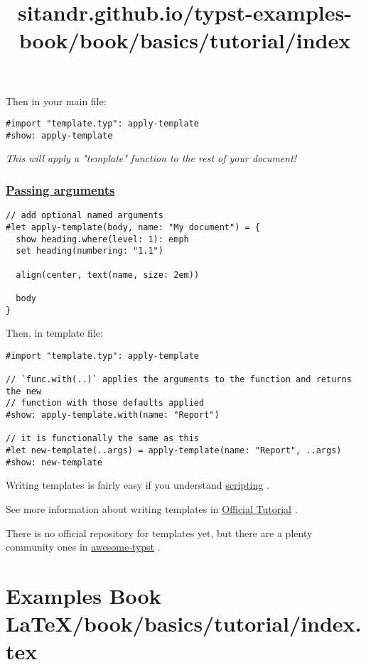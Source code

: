 Then in your main file:

\begin{verbatim}
#import "template.typ": apply-template
#show: apply-template
\end{verbatim}

\emph{This will apply a "template" function to the rest of your
document!}

\subsubsection{\texorpdfstring{\hyperref[passing-arguments]{Passing
arguments}}{Passing arguments}}\label{passing-arguments}

\begin{verbatim}
// add optional named arguments
#let apply-template(body, name: "My document") = {
  show heading.where(level: 1): emph
  set heading(numbering: "1.1")

  align(center, text(name, size: 2em))

  body
}
\end{verbatim}

Then, in template file:

\begin{verbatim}
#import "template.typ": apply-template

// `func.with(..)` applies the arguments to the function and returns the new
// function with those defaults applied
#show: apply-template.with(name: "Report")

// it is functionally the same as this
#let new-template(..args) = apply-template(name: "Report", ..args)
#show: new-template
\end{verbatim}

Writing templates is fairly easy if you understand
\href{../scripting/index.html}{scripting} .

See more information about writing templates in
\href{https://typst.app/docs/tutorial/making-a-template/}{Official
Tutorial} .

There is no official repository for templates yet, but there are a
plenty community ones in
\href{https://github.com/qjcg/awesome-typst?ysclid=lj8pur1am7431908794\#general}{awesome-typst}
.


\section{Examples Book LaTeX/book/basics/tutorial/index.tex}
\title{sitandr.github.io/typst-examples-book/book/basics/tutorial/index}


